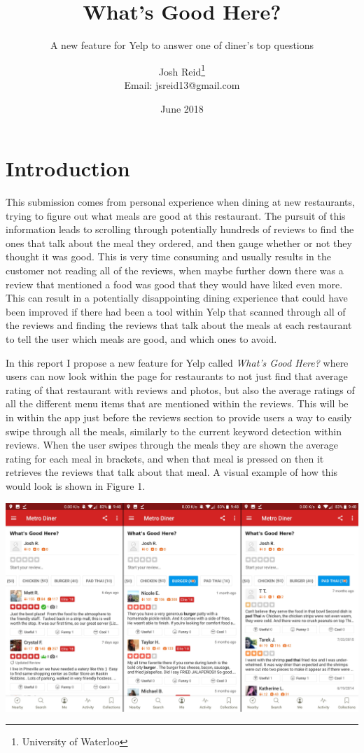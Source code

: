 \documentclass[12pt, openany]{scrbook}
\title{What's Good Here?}
\subtitle{A new feature for Yelp to answer one of diner's top questions}
\date{June 2018}
\author{Josh Reid\thanks{University of Waterloo} \\ Email: jsreid13@gmail.com}
\begin{document}
\maketitle

\chapter{Introduction}

This submission comes from personal experience when dining at new restaurants,
trying to figure out what meals are good at this restaurant.
The pursuit of this information leads to scrolling through potentially
hundreds of reviews to find the ones that talk about the meal they
ordered, and then gauge whether or not they thought it was good.
This is very time consuming and usually results in the customer not
reading all of the reviews, when maybe further down there was a review
that mentioned a food was good that they would have liked even more.
This can result in a potentially disappointing dining experience that could 
have been improved if there had been a tool within Yelp that scanned
through all of the reviews and finding the reviews that talk about the meals at each
restaurant to tell the user which meals are good, and which ones to avoid.

In this report I propose a new feature for Yelp called \emph{What's Good Here?}
where users can now look within the page for restaurants to not just
find that average rating of that restaurant with reviews and photos, but also the average
ratings of all the different menu items that are mentioned within the reviews.
This will be in within the app just before the reviews section to provide users
a way to easily swipe through all the meals, similarly to the current keyword
detection within reviews.
When the user swipes through the meals they are shown the average rating for
each meal in brackets, and when that meal is pressed on then it retrieves the
reviews that talk about that meal.
A visual example of how this would look is shown in Figure 1.

\begin{center}
\noindent
\includegraphics[width=\textwidth]{yelp_whats_good_here_combined.jpg}
\end{center}
\end{document}
